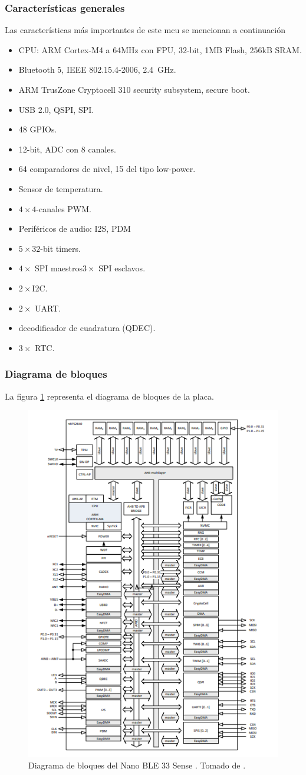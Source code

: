 \subsubsection*{Características generales}
Las características más importantes de este mcu se mencionan a continuación \cite{web}
\begin{multicols}{2}
 \begin{itemize}
    \item CPU: ARM Cortex-M4 a 64MHz con FPU, 32-bit, 1MB Flash, 256kB SRAM.
    \item Bluetooth 5, IEEE 802.15.4-2006, \SI{2.4}{\giga\Hz}.
    \item ARM TrusZone Cryptocell 310 security subsystem, secure boot.
    \item USB 2.0, QSPI, SPI.
    \item 48 GPIOs.
    \item 12-bit, ADC con 8 canales.
    \item 64 comparadores de nivel, 15 del tipo low-power.
    \item Sensor de temperatura.
    \item $4\times4$-canales PWM.
    \item Periféricos de audio: I2S, PDM
    \item $5\times32$-bit timers.
    \item $4\times$ SPI maestros\/$3\times$ SPI esclavos.
    \item $2\times$I2C.
    \item $2\times$ UART.
    \item decodificador de cuadratura (QDEC).
    \item $3\times$ RTC.
\end{itemize}   
\end{multicols}

\subsubsection*{Diagrama de bloques}
La figura \ref{fig1} representa el diagrama de bloques de la placa.
\begin{figure}[H]
\centering
\includegraphics[width=.55\linewidth]{Img/1.png}
 \caption{Diagrama de bloques del Nano BLE 33 Sense . Tomado de \cite{web}.}
 \label{fig1} 
\end{figure}
\newpage
